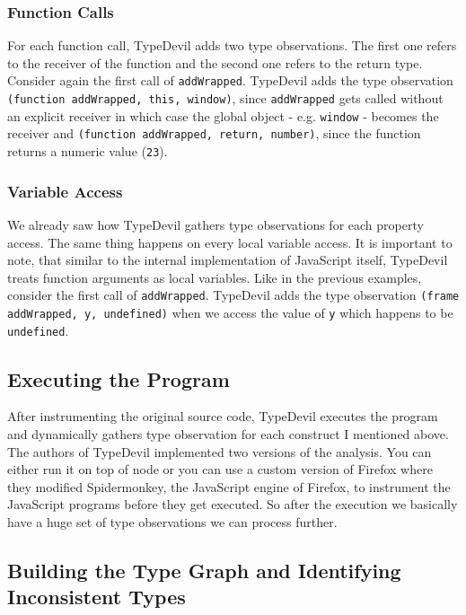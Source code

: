 \documentclass[runningheads,a4paper]{llncs}
\begin{document}
\subsubsection{Function Calls}
For each function call, TypeDevil adds two type observations.
The first one refers to the receiver of the function and the second one refers to the return type.
Consider again the first call of \lstinline[columns=fixed]{addWrapped}.
TypeDevil adds the type observation \lstinline[columns=fixed]{(function addWrapped, this, window)}, since \lstinline[columns=fixed]{addWrapped} gets called without an explicit receiver in which case the global object - e.g. \lstinline[columns=fixed]{window} - becomes the receiver
and \lstinline[columns=fixed]{(function addWrapped, return, number)}, since the function returns a numeric value (\lstinline[columns=fixed]{23}).

\subsubsection{Variable Access}
We already saw how TypeDevil gathers type observations for each property access.
The same thing happens on every local variable access.
It is important to note, that similar to the internal implementation of JavaScript itself, TypeDevil treats function arguments as local variables.
Like in the previous examples, consider the first call of \lstinline[columns=fixed]{addWrapped}.
TypeDevil adds the type observation \lstinline[columns=fixed]{(frame addWrapped, y, undefined)} when we access the value of \lstinline[columns=fixed]{y} which happens to be \lstinline[columns=fixed]{undefined}.

\subsection{Executing the Program}
After instrumenting the original source code, TypeDevil executes the program and dynamically gathers type observation for each construct I mentioned above.
The authors of TypeDevil implemented two versions of the analysis. You can either run it on top of node or you can use a custom version of Firefox where they modified Spidermonkey, the JavaScript engine of Firefox, to instrument the JavaScript programs before they get executed.
So after the execution we basically have a huge set of type observations we can process further.

\subsection{Building the Type Graph and Identifying Inconsistent Types}
\end{document}
